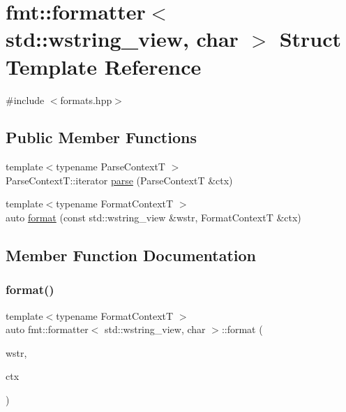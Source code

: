 \hypertarget{structfmt_1_1formatter_3_01std_1_1wstring__view_00_01char_01_4}{}\section{fmt\+:\+:formatter$<$ std\+:\+:wstring\+\_\+view, char $>$ Struct Template Reference}
\label{structfmt_1_1formatter_3_01std_1_1wstring__view_00_01char_01_4}


{\ttfamily \#include $<$formats.\+hpp$>$}

\subsection*{Public Member Functions}
\begin{DoxyCompactItemize}
\item 
{\footnotesize template$<$typename Parse\+ContextT $>$ }\\Parse\+Context\+T\+::iterator \mbox{\hyperlink{structfmt_1_1formatter_3_01std_1_1wstring__view_00_01char_01_4_a1acf888d27d4c33cb9fe0a0fc1390748}{parse}} (Parse\+ContextT \&ctx)
\item 
{\footnotesize template$<$typename Format\+ContextT $>$ }\\auto \mbox{\hyperlink{structfmt_1_1formatter_3_01std_1_1wstring__view_00_01char_01_4_a61120d5ac758b7d548a1e44968c98441}{format}} (const std\+::wstring\+\_\+view \&wstr, Format\+ContextT \&ctx)
\end{DoxyCompactItemize}


\subsection{Member Function Documentation}
\mbox{\label{structfmt_1_1formatter_3_01std_1_1wstring__view_00_01char_01_4_a61120d5ac758b7d548a1e44968c98441}} 
\subsubsection{\texorpdfstring{format()}{format()}}
{\footnotesize\ttfamily template$<$typename Format\+ContextT $>$ \\
auto fmt\+::formatter$<$ std\+::wstring\+\_\+view, char $>$\+::format (\begin{DoxyParamCaption}\item[{const std\+::wstring\+\_\+view \&}]{wstr,  }\item[{Format\+ContextT \&}]{ctx }\end{DoxyParamCaption})}

